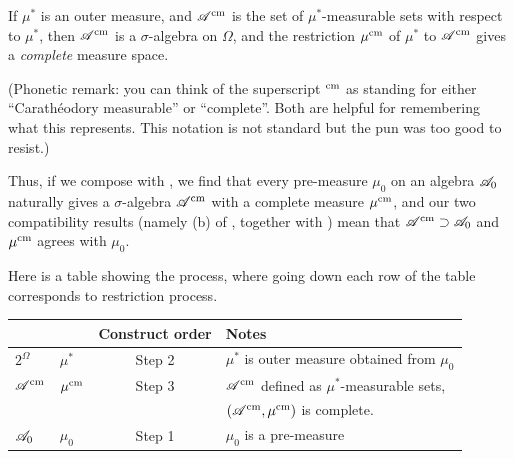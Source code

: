 \begin{theorem}
	\label{thm:cara_outer}
	If $\mu^\ast$ is an outer measure,
	and $\mathscr A^\text{cm}$ is the set of $\mu^\ast$-measurable sets
	with respect to $\mu^\ast$,
	then $\mathscr A^\text{cm}$ is a $\sigma$-algebra on $\Omega$,
	and the restriction $\mu^\text{cm}$ of $\mu^\ast$ to $\mathscr A^\text{cm}$
	gives a \emph{complete} measure space.
\end{theorem}
(Phonetic remark: you can think of the superscript ${}^\text{cm}$ as standing
for either ``Carath\'{e}odory measurable'' or ``complete''.
Both are helpful for remembering what this represents.
This notation is not standard but the pun was too good to resist.)

Thus, if we compose  with ,
we find that every pre-measure $\mu_0$ on an algebra $\mathscr A_0$ naturally
gives a $\sigma$-algebra $\mathscr A^\text{cm}$ with a complete measure $\mu^\text{cm}$,
and our two compatibility results
(namely (b) of ,
together with )
mean that $\mathscr A^\text{cm} \supset \mathscr A_0$
and $\mu^\text{cm}$ agrees with $\mu_0$.

Here is a table showing the process,
where going down each row of the table corresponds to restriction process.
\begin{center}
	\begin{tabular}[h]{llcl}
		& & Construct order & Notes \\ \hline
		$2^\Omega$ & $\mu^\ast$ & Step 2 &
			$\mu^\ast$ is outer measure obtained from $\mu_0$ \\[1em]
		$\mathscr A^\text{cm}$ & $\mu^\text{cm}$ & Step 3 & $\mathscr A^\text{cm}$ defined as $\mu^\ast$-measurable sets, \\
		&&& $(\mathscr A^\text{cm}, \mu^\text{cm})$ is complete. \\[1em]
		$\mathscr A_0$ & $\mu_0$ & Step 1 & $\mu_0$ is a pre-measure
	\end{tabular}
\end{center}


